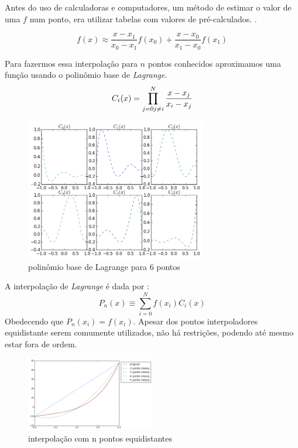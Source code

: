  Antes do uso de calculadoras e computadores, um método de estimar o valor de uma $f$ num ponto, era utilizar tabelas com valores de pré-calculados. .

\begin{equation}
	f(x) \approx \frac{x - x_1}{x_0 - x_1}f(x_0)  + \frac{x - x_0}{x_1 - x_0}f(x_1)
\end{equation} 
 
 Para fazermos essa interpolação para $n$ pontos conhecidos aproximamos uma função usando o polinômio base de \emph{Lagrange}.
\begin{equation}
C_i(x) = \prod_{j = 0 \\ j \neq i}^{N} \frac{x - x_j}{x_i - x_j} 
\end{equation}

\begin{figure}[!h]
\includegraphics[width=0.7\textwidth, center ]{figuras/exemplo_polinomio_lagrange.png}
\caption{polinômio base de Lagrange para 6 pontos}
\end{figure}

 A interpolação de \emph{Lagrange} é dada por :
\begin{equation}
 P_n(x) \equiv \sum_{i = 0}^{N} f(x_i)C_i(x) 
\end{equation}
 Obedecendo que $P_n(x_i) = f(x_i)$. Apesar dos pontos interpoladores equidistante serem comumente utilizados, não há restrições, podendo até mesmo estar fora de ordem.
\begin{figure}[h]
  \includegraphics[width=0.5\textwidth, center]{figuras/interpolacao_linear5.png}
  \caption{interpolação com n pontos equidistantes}
\end{figure}

